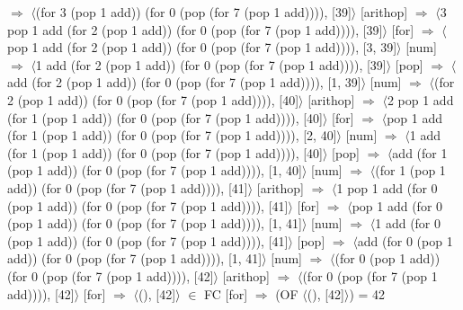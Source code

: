 \documentclass[12pt]{report}
\begin{document}
$\Rightarrow$ $\langle$(for 3 (pop 1 add)) (for 0 (pop (for 7 (pop 1 add)))), [39]$\rangle$ \hfill [arithop] \newline
$\Rightarrow$ $\langle$3 pop 1 add (for 2 (pop 1 add)) (for 0 (pop (for 7 (pop 1 add)))), [39]$\rangle$ \hfill [for] \newline
$\Rightarrow$ $\langle$pop 1 add (for 2 (pop 1 add)) (for 0 (pop (for 7 (pop 1 add)))), [3, 39]$\rangle$ \hfill [num] \newline
$\Rightarrow$ $\langle$1 add (for 2 (pop 1 add)) (for 0 (pop (for 7 (pop 1 add)))), [39]$\rangle$ \hfill [pop] \newline
$\Rightarrow$ $\langle$add (for 2 (pop 1 add)) (for 0 (pop (for 7 (pop 1 add)))), [1, 39]$\rangle$ \hfill [num] \newline
$\Rightarrow$ $\langle$(for 2 (pop 1 add)) (for 0 (pop (for 7 (pop 1 add)))), [40]$\rangle$ \hfill [arithop] \newline
$\Rightarrow$ $\langle$2 pop 1 add (for 1 (pop 1 add)) (for 0 (pop (for 7 (pop 1 add)))), [40]$\rangle$ \hfill [for] \newline
$\Rightarrow$ $\langle$pop 1 add (for 1 (pop 1 add)) (for 0 (pop (for 7 (pop 1 add)))), [2, 40]$\rangle$ \hfill [num] \newline
$\Rightarrow$ $\langle$1 add (for 1 (pop 1 add)) (for 0 (pop (for 7 (pop 1 add)))), [40]$\rangle$ \hfill [pop] \newline
$\Rightarrow$ $\langle$add (for 1 (pop 1 add)) (for 0 (pop (for 7 (pop 1 add)))), [1, 40]$\rangle$ \hfill [num] \newline
$\Rightarrow$ $\langle$(for 1 (pop 1 add)) (for 0 (pop (for 7 (pop 1 add)))), [41]$\rangle$ \hfill [arithop] \newline
$\Rightarrow$ $\langle$1 pop 1 add (for 0 (pop 1 add)) (for 0 (pop (for 7 (pop 1 add)))), [41]$\rangle$ \hfill [for] \newline
$\Rightarrow$ $\langle$pop 1 add (for 0 (pop 1 add)) (for 0 (pop (for 7 (pop 1 add)))), [1, 41]$\rangle$ \hfill [num] \newline
$\Rightarrow$ $\langle$1 add (for 0 (pop 1 add)) (for 0 (pop (for 7 (pop 1 add)))), [41]$\rangle$ \hfill [pop] \newline
$\Rightarrow$ $\langle$add (for 0 (pop 1 add)) (for 0 (pop (for 7 (pop 1 add)))), [1, 41]$\rangle$ \hfill [num] \newline
$\Rightarrow$ $\langle$(for 0 (pop 1 add)) (for 0 (pop (for 7 (pop 1 add)))), [42]$\rangle$ \hfill [arithop] \newline
$\Rightarrow$ $\langle$(for 0 (pop (for 7 (pop 1 add)))), [42]$\rangle$ \hfill [for] \newline
$\Rightarrow$ $\langle$(), [42]$\rangle$ $\in$ FC \hfill [for] \newline
$\Rightarrow$ (OF $\langle$(), [42]$\rangle$) = 42 \newline
\end{document}
